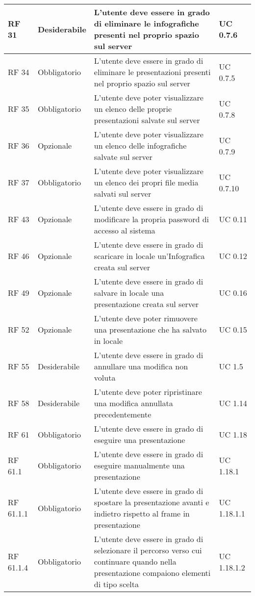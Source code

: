{\begin{longtable} [c]{| p{2.5cm} | p{2.5cm} | p{6cm} |p{2.5cm}|}
 \hline 
RF 31 & Desiderabile & L'utente deve essere in grado di eliminare le infografiche presenti nel proprio spazio sul server & UC 0.7.6\\ 
 \hline 
RF 34 & Obbligatorio & L’utente deve essere in grado di eliminare le presentazioni presenti nel proprio spazio sul server & UC 0.7.5\\ 
 \hline 
RF 35 & Obbligatorio & L'utente deve poter visualizzare un elenco delle proprie presentazioni salvate sul server & UC 0.7.8\\ 
 \hline 
RF 36 & Opzionale & L'utente deve poter visualizzare un elenco delle infografiche salvate sul server & UC 0.7.9\\ 
 \hline 
RF 37 & Obbligatorio & L'utente deve poter visualizzare un elenco dei propri file media salvati sul server & UC 0.7.10\\ 
 \hline 
RF 43 & Opzionale & L’utente deve essere in grado di modificare la propria password di accesso al sistema & UC 0.11\\ 
 \hline 
RF 46 & Opzionale & L’utente deve essere in grado di scaricare in locale un’Infografica creata sul server & UC 0.12\\ 
 \hline 
RF 49 & Opzionale & L’utente deve essere in grado di salvare in locale una presentazione creata sul server & UC 0.16\\ 
 \hline 
RF 52 & Opzionale & L’utente deve poter rimuovere una presentazione che ha salvato in locale & UC 0.15\\ 
 \hline 
RF 55 & Desiderabile & L'utente deve essere in grado di annullare una modifica non voluta & UC 1.5\\ 
 \hline 
RF 58 & Desiderabile & L'utente deve poter ripristinare una modifica annullata precedentemente & UC 1.14\\ 
 \hline 
RF 61 & Obbligatorio & L'utente deve essere in grado di eseguire una presentazione & UC 1.18\\ 
 \hline 
RF 61.1 & Obbligatorio & L'utente deve essere in grado di eseguire manualmente una presentazione & UC 1.18.1\\ 
 \hline 
RF 61.1.1 & Obbligatorio & L'utente deve essere in grado di spostare la presentazione avanti e indietro rispetto al frame in presentazione & UC 1.18.1.1\\ 
 \hline 
RF 61.1.4 & Obbligatorio & L'utente deve essere in grado di selezionare il percorso verso cui continuare quando nella presentazione compaiono elementi di tipo scelta & UC 1.18.1.2\\ 
 \hline 

\end{longtable}}
